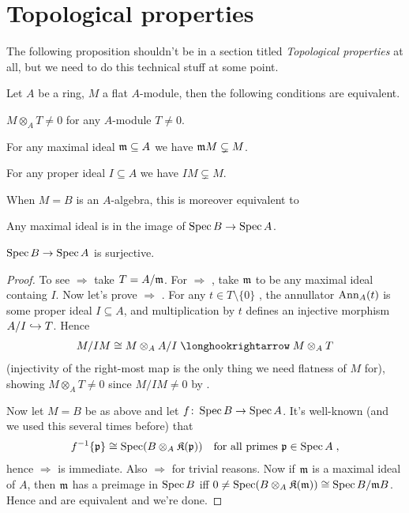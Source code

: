 \documentclass[a4paper,parskip=half,numbers=enddot, DIV=12]{scrreprt}
\begin{document}
\section{Topological properties}
The following proposition shouldn't be in a section titled \emph{Topological properties} at all, but we need to do this technical stuff at some point.
\begin{prop}
	Let $A$ be a ring, $M$ a flat $A$-module, then the following conditions are equivalent.
	\begin{alphanumerate}
		\item $M\otimes_AT\neq 0$ for any $A$-module $T\neq 0$.
		\item For any maximal ideal $\mathfrak{m}\subseteq A$ we have $\mathfrak{m} M\subsetneq M$.
		\item For any proper ideal $I\subseteq A$ we have $IM\subsetneq M$.
	\end{alphanumerate}
	When $M=B$ is an $A$-algebra, this is moreover equivalent to
	\begin{alphanumerate}\setcounter{enumi}{3}
		\item Any maximal ideal is in the image of $\Spec B\morphism\Spec A$.
		\item $\Spec B\morphism\Spec A$ is surjective.
	\end{alphanumerate}
\end{prop}
\begin{proof}
	To see  $\Rightarrow$  take $T=A/\mathfrak{m}$. For  $\Rightarrow$ , take $\mathfrak{m}$ to be any maximal ideal containg $I$. Now let's prove  $\Rightarrow$ . For any $t\in T\setminus\{0\}$ , the annullator $\operatorname{Ann}_A(t)$ is some proper ideal $I\subseteq A$, and multiplication by $t$ defines an injective morphism $A/I\monomorphism T$. Hence
	\begin{align*}
		M/IM\cong M\otimes_AA/I\monomorphism M\otimes_AT
	\end{align*}
	(injectivity of the right-most map is the only thing we need flatness of $M$ for), showing $M\otimes_AT\neq 0$ since $M/IM\neq 0$ by .
	
	Now let $M=B$ be as above and let $f\colon \Spec B\morphism\Spec A$. It's well-known (and we used this several times before) that 
	\begin{align*}
		f^{-1}\{\mathfrak{p}\}\cong \operatorname{Spec} (B\otimes_A\mathfrak{K}(\mathfrak{p}))\quad\text{for all primes }\mathfrak{p}\in\operatorname{Spec} A\;,
	\end{align*}
	hence  $\Rightarrow$  is immediate. Also  $\Rightarrow$  for trivial reasons. Now if $\mathfrak{m}$ is a maximal ideal of $A$, then $\mathfrak{m}$ has a preimage in $\operatorname{Spec} B$ iff $0\neq \operatorname{Spec} (B\otimes_A\mathfrak{K}(\mathfrak{m}))\cong \operatorname{Spec} B/\mathfrak{m} B$. Hence  and  are equivalent and we're done.
\end{proof}
\end{document}
